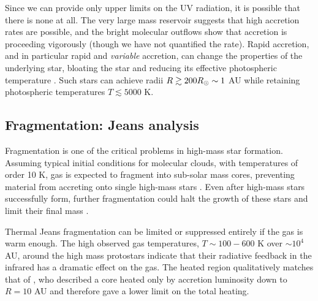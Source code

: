 \documentclass{aa}
\begin{document}
Since we can provide only upper limits on the UV radiation, it is possible
that there is none at all.  The very large mass reservoir suggests that high
accretion rates are possible, and the bright molecular outflows show that
accretion is proceeding vigorously (though we have not quantified the rate).  
Rapid accretion, and in particular rapid and \emph{variable} accretion,
can change the properties of the underlying star, bloating the star
and reducing its effective photospheric temperature \citep{Hosokawa2009a,
Smith2012h, Hosokawa2016a}.  Such stars can achieve radii $R\gtrsim200 R_{\odot}
\sim 1$ AU while retaining photospheric temperatures $T\lesssim5000$ K.

\subsection{Fragmentation: Jeans analysis}
\label{sec:fragmentation}
Fragmentation is one of the critical problems in high-mass star formation.
Assuming typical initial conditions for molecular clouds, with temperatures of
order 10 K, gas is expected to fragment into sub-solar mass cores, preventing
material from accreting onto single high-mass stars \citep{Krumholz2015a}.
Even after high-mass stars successfully form, further fragmentation could
halt the growth of these stars and limit their final mass \citep{Peters2010a}.

Thermal Jeans fragmentation can be limited or suppressed entirely if the gas is
warm enough.  The high observed gas temperatures, $T\sim100-600$ K over
$\sim10^4$ AU, around the high mass protostars indicate that their radiative
feedback in the infrared has a dramatic effect on the gas.  The heated region
qualitatively matches that of \citet{Krumholz2006a}, who described
a core heated only by accretion luminosity down to $R=10$ AU and therefore
gave a lower limit on the total heating. 
\end{document}
